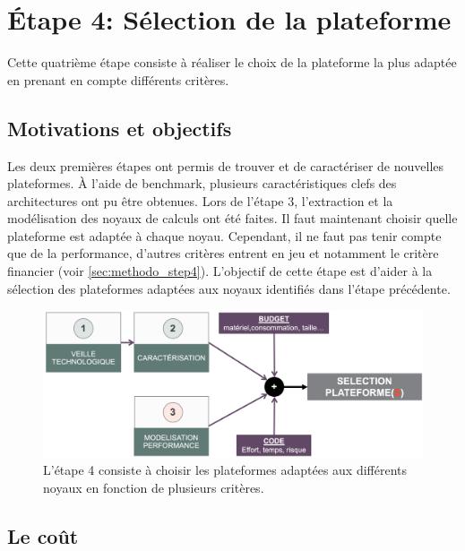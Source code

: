 \section{Étape 4: Sélection de la plateforme} \label{sec:methodo_step4}

Cette quatrième étape consiste à réaliser le choix de la plateforme la plus adaptée en prenant en compte différents critères.

\subsection{Motivations et objectifs}
    
    
    Les deux premières étapes ont permis de trouver et de caractériser de nouvelles plateformes. À l'aide de benchmark, plusieurs caractéristiques clefs des architectures ont pu être obtenues. Lors de l'étape 3, l'extraction et la modélisation des noyaux de calculs ont été faites. Il faut maintenant choisir quelle plateforme est adaptée à chaque noyau. Cependant, il ne faut pas tenir compte que de la performance, d'autres critères entrent en jeu et notamment le critère financier (voir \autoref{sec:methodo_step4}).
    L'objectif de cette étape est d'aider à la sélection des plateformes adaptées aux noyaux identifiés dans l'étape précédente.

    \begin{figure}
        \center
        \includegraphics[width=14cm]{images/methodo_step4.png}
        \caption{\label{pic:methodo_step4}L'étape 4 consiste à choisir les plateformes adaptées aux différents noyaux en fonction de plusieurs critères.}
    \end{figure}



\subsection{Le coût}
    
